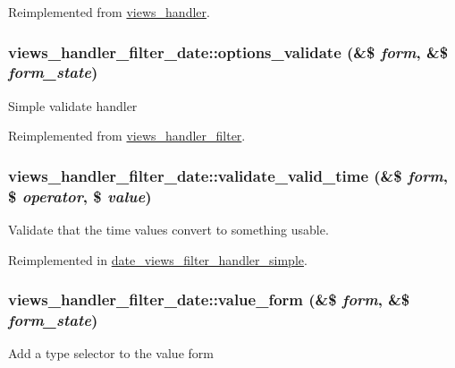 Reimplemented from \hyperlink{classviews__handler_a2dd536754e4764cc82ffe7c864f54b16}{views\_\-handler}.\hypertarget{classviews__handler__filter__date_a6d4e05f04a0f9ea5663f165777f54003}{
\subsubsection[{options\_\-validate}]{\setlength{\rightskip}{0pt plus 5cm}views\_\-handler\_\-filter\_\-date::options\_\-validate (\&\$ {\em form}, \/  \&\$ {\em form\_\-state})}}
\label{classviews__handler__filter__date_a6d4e05f04a0f9ea5663f165777f54003}
Simple validate handler 

Reimplemented from \hyperlink{classviews__handler__filter_a1156751e912662ce47ad680cbe2c03a3}{views\_\-handler\_\-filter}.\hypertarget{classviews__handler__filter__date_ad19ed65f3335ed1ac6896fe17a480b4e}{
\subsubsection[{validate\_\-valid\_\-time}]{\setlength{\rightskip}{0pt plus 5cm}views\_\-handler\_\-filter\_\-date::validate\_\-valid\_\-time (\&\$ {\em form}, \/  \$ {\em operator}, \/  \$ {\em value})}}
\label{classviews__handler__filter__date_ad19ed65f3335ed1ac6896fe17a480b4e}
Validate that the time values convert to something usable. 

Reimplemented in \hyperlink{classdate__views__filter__handler__simple_ac0a2fbc2f0984aab89796283d5b8c995}{date\_\-views\_\-filter\_\-handler\_\-simple}.\hypertarget{classviews__handler__filter__date_a5c7fb298feef092a2cb3bc3f75f54f29}{
\subsubsection[{value\_\-form}]{\setlength{\rightskip}{0pt plus 5cm}views\_\-handler\_\-filter\_\-date::value\_\-form (\&\$ {\em form}, \/  \&\$ {\em form\_\-state})}}
\label{classviews__handler__filter__date_a5c7fb298feef092a2cb3bc3f75f54f29}
Add a type selector to the value form 

